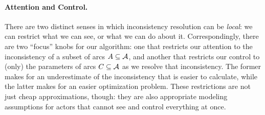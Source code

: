\paragraph{Attention and Control.}
There are two distinct senses in which inconsistency resolution can
    be \emph{local}: we can restrict what we can see, or what we can do about it.
Correspondingly, there are two ``focus'' knobs for our algorithm:
    one that restricts our attention to the inconsistency of a subset of arcs $A \subseteq \mathcal A$,
    and another that restricts our control to (only) the parameters of
    arcs
    $C
     \subseteq \mathcal A$
      as we resolve that inconsistency.
The former makes for an underestimate of the inconsistency that is easier to calculate, while
the latter
makes for an easier optimization problem.
These restrictions are not just cheap approximations, though:
    they are also appropriate modeling assumptions for
    actors that cannot see and control everything at once.

